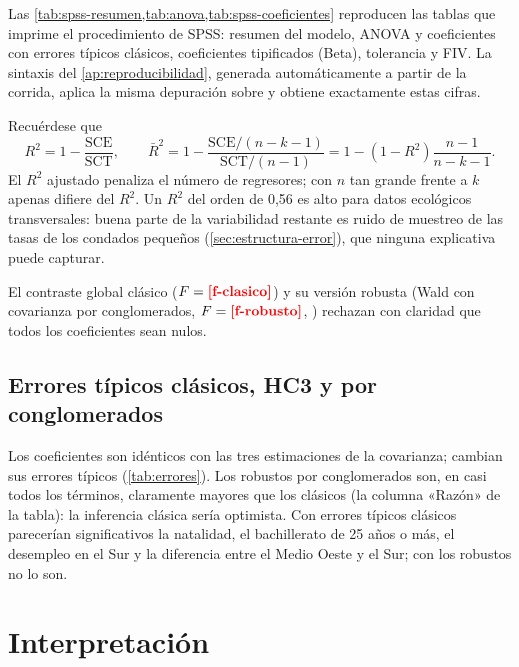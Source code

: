 Las \cref{tab:spss-resumen,tab:anova,tab:spss-coeficientes} reproducen las tablas que imprime el
procedimiento  de SPSS: resumen del modelo, ANOVA y coeficientes con errores
típicos clásicos, coeficientes tipificados (Beta), tolerancia y FIV. La sintaxis del
\cref{ap:reproducibilidad}, generada automáticamente a partir de la corrida, aplica la misma
depuración sobre  y obtiene exactamente estas cifras.




Recuérdese que
\[
R^2=1-\frac{\mathrm{SCE}}{\mathrm{SCT}},\qquad
\bar R^2=1-\frac{\mathrm{SCE}/(n-k-1)}{\mathrm{SCT}/(n-1)}=1-(1-R^2)\frac{n-1}{n-k-1}.
\]
El $R^2$ ajustado penaliza el número de regresores; con $n$ tan grande frente a $k$ apenas
difiere del $R^2$. Un $R^2$ del orden de 0,56 es alto para datos ecológicos transversales: buena
parte de la variabilidad restante es ruido de muestreo de las tasas de los condados pequeños
(\cref{sec:estructura-error}), que ninguna explicativa puede capturar.

El contraste global clásico ($F=\res{f-clasico}$) y su versión robusta (Wald con covarianza por
conglomerados, $F=\res{f-robusto}$, ) rechazan con claridad que todos los
coeficientes sean nulos.



\subsection{Errores típicos clásicos, HC3 y por conglomerados}

Los coeficientes son idénticos con las tres estimaciones de la covarianza; cambian sus errores
típicos (\cref{tab:errores}). Los robustos por conglomerados son, en casi todos los términos,
claramente mayores que los clásicos (la columna «Razón» de la tabla): la inferencia clásica sería
optimista. Con errores típicos clásicos parecerían significativos la natalidad, el bachillerato de
25 años o más, el desempleo en el Sur y la diferencia entre el Medio Oeste y el Sur; con los
robustos no lo son.



\section{Interpretación}\label{sec:interpretacion}


